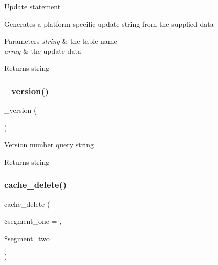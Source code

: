 Update statement

Generates a platform-\/specific update string from the supplied data


\begin{DoxyParams}{Parameters}
{\em string} & the table name \\
\hline
{\em array} & the update data \\
\hline
\end{DoxyParams}
\begin{DoxyReturn}{Returns}
string 
\end{DoxyReturn}
\mbox{\label{class_c_i___d_b__driver_ac997a462bb342f97f414910f0e033fb6}} 
\subsubsection{\texorpdfstring{\+\_\+version()}{\_version()}}
{\footnotesize\ttfamily \+\_\+version (\begin{DoxyParamCaption}{ }\end{DoxyParamCaption})\hspace{0.3cm}{\ttfamily [protected]}}

Version number query string

\begin{DoxyReturn}{Returns}
string 
\end{DoxyReturn}
\mbox{\label{class_c_i___d_b__driver_a4ccac0d027f9e49091f98d0acbbff13c}} 
\subsubsection{\texorpdfstring{cache\+\_\+delete()}{cache\_delete()}}
{\footnotesize\ttfamily cache\+\_\+delete (\begin{DoxyParamCaption}\item[{}]{\$segment\+\_\+one = {\ttfamily \textquotesingle{}\textquotesingle{}},  }\item[{}]{\$segment\+\_\+two = {\ttfamily \textquotesingle{}\textquotesingle{}} }\end{DoxyParamCaption})}

